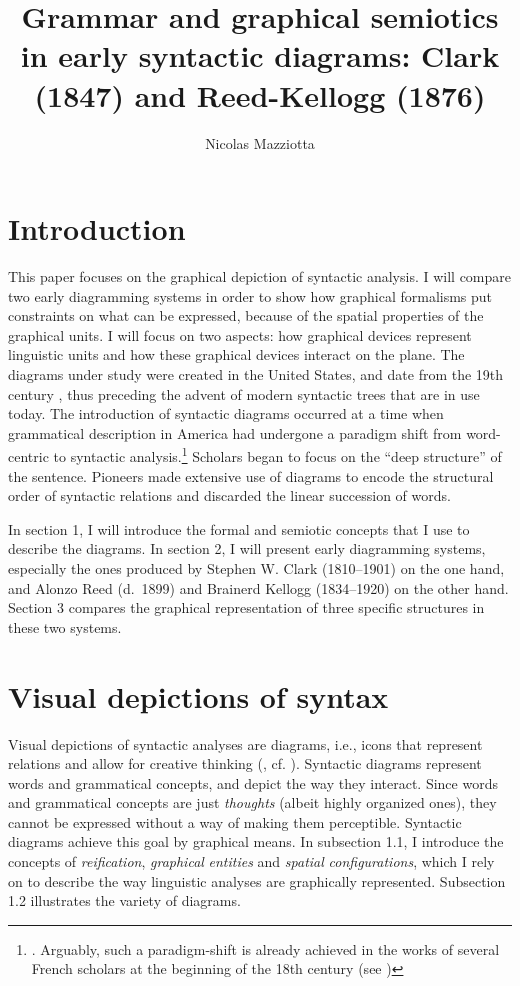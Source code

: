 \documentclass[output=paper]{langsci/langscibook}
\author{Nicolas Mazziotta\affiliation{Université de Liège}}
\title{Grammar and graphical semiotics in early syntactic diagrams: Clark (1847) and Reed-Kellogg (1876)}
\begin{document}
\maketitle

\section*{Introduction} 

 This paper focuses on the graphical depiction of syntactic analysis. I will compare two early diagramming systems in order to show how graphical formalisms put constraints on what can be expressed, because of the spatial properties of the graphical units. I will focus on two aspects: how graphical devices represent linguistic units and how these graphical devices interact on the plane. The diagrams under study were created in the United States, and date from the 19th century \citep{brittain_critical_1973}, thus preceding the advent of modern syntactic trees that are in use today. The introduction of syntactic diagrams occurred at a time when grammatical description in America had undergone a paradigm shift from word-centric to syntactic analysis.\footnote{\textrm{\citet[76]{aarts_handbook_2006}. Arguably, such a paradigm-shift is already achieved in the works of several French scholars at the beginning of the 18th century (see \citealt{imrenyi_how_2020})}} Scholars began to focus on the “deep structure” of the sentence. Pioneers made extensive use of diagrams to encode the structural order of syntactic relations and discarded the linear succession of words. 

In section 1, I will introduce the formal and semiotic concepts that I use to describe the diagrams. In section 2, I will present early diagramming systems, especially the ones produced by Stephen W. Clark (1810–1901) on the one hand, and Alonzo Reed (d.~1899) and Brainerd Kellogg (1834–1920) on the other hand. Section 3 compares the graphical representation of three specific structures in these two systems.

\section{Visual depictions of syntax}

Visual depictions of syntactic analyses are diagrams, i.e., icons that represent relations and allow for creative thinking (\citealt{peirce_collected_1994}, cf. \citealt[36-42]{chauvire_oeil_2008}). Syntactic diagrams represent words and grammatical concepts, and depict the way they interact. Since words and grammatical concepts are just \textit{thoughts} (albeit highly organized ones), they cannot be expressed without a way of making them perceptible. Syntactic diagrams achieve this goal by graphical means. In subsection 1.1, I introduce the concepts of \textit{reification}, \textit{graphical} \textit{entities} and \textit{spatial} \textit{configurations}, which I rely on to describe the way linguistic analyses are graphically represented. Subsection 1.2 illustrates the variety of diagrams. 
\end{document}
